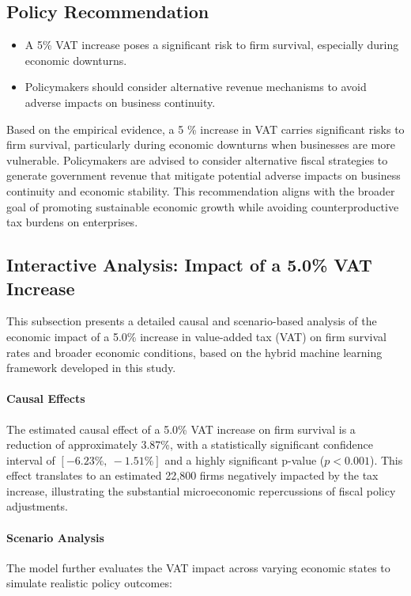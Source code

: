 \subsection{Policy Recommendation}

\begin{itemize}
  \item A 5\% VAT increase poses a significant risk to firm survival, especially during economic downturns.
  \item Policymakers should consider alternative revenue mechanisms to avoid adverse impacts on business continuity.
\end{itemize}
\vspace{0.5em}
\noindent
Based on the empirical evidence, a 5 \% increase in VAT carries significant risks to firm survival, particularly during economic downturns when businesses are more vulnerable. Policymakers are advised to consider alternative fiscal strategies to generate government revenue that mitigate potential adverse impacts on business continuity and economic stability. This recommendation aligns with the broader goal of promoting sustainable economic growth while avoiding counterproductive tax burdens on enterprises.

\subsection{Interactive Analysis: Impact of a 5.0\% VAT Increase}

This subsection presents a detailed causal and scenario-based analysis of the economic impact of a 5.0\% increase in value-added tax (VAT) on firm survival rates and broader economic conditions, based on the hybrid machine learning framework developed in this study.

\paragraph{Causal Effects}
The estimated causal effect of a 5.0\% VAT increase on firm survival is a reduction of approximately 3.87\%, with a statistically significant confidence interval of $[-6.23\%,\ -1.51\%]$ and a highly significant p-value ($p < 0.001$). This effect translates to an estimated 22,800 firms negatively impacted by the tax increase, illustrating the substantial microeconomic repercussions of fiscal policy adjustments.

\paragraph{Scenario Analysis}
The model further evaluates the VAT impact across varying economic states to simulate realistic policy outcomes:

